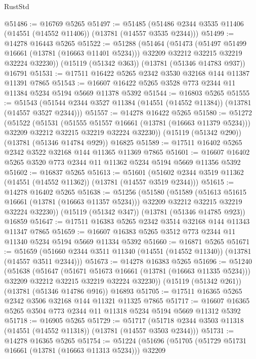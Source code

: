 \begin{lexlean}{RustStd}
\begin{coremodule}
@51486 := @16769 @5265
@51497 := @51485 (@51486 @2344 @3535 @11406 (@14551 (@14552 @11406)) (@13781 (@14557 @3535 @2344)))
@51499 := @14278 @16443 @5265
@51522 := @51288
    (@51464
      (@51473
        (@51497 @51499 @16661 (@13781 (@16663 @11401 @5234)))
        @32209
        @32212
        @32215
        @32219
        @32224
        @32230))
    (@15119 (@51342 @363))
    (@13781 (@51346 @14783 @937))
    @16791
@51531 := @17511 @16422 @5265 @2342 @3530 @32168 @144 @11387 @11391 @7865
@51543 := @16607 @16422 @5265 @3528 @773 @2344 @11 @11384 @5234 @5194 @5669 @11378 @5392
@51544 := @16803 @5265
@51555 := @51543 (@51544 @2344 @3527 @11384 (@14551 (@14552 @11384)) (@13781 (@14557 @3527 @2344)))
@51557 := @14278 @16422 @5265
@51580 := @51272
    (@51522
      (@51531
        (@51555 @51557 @16661 (@13781 (@16663 @11379 @5234)))
        @32209
        @32212
        @32215
        @32219
        @32224
        @32230))
    (@15119 (@51342 @290))
    (@13781 (@51346 @14784 @929))
    @16825
@51589 := @17511 @16402 @5265 @2342 @3522 @32168 @144 @11365 @11369 @7865
@51601 := @16607 @16402 @5265 @3520 @773 @2344 @11 @11362 @5234 @5194 @5669 @11356 @5392
@51602 := @16837 @5265
@51613 := @51601 (@51602 @2344 @3519 @11362 (@14551 (@14552 @11362)) (@13781 (@14557 @3519 @2344)))
@51615 := @14278 @16402 @5265
@51638 := @51256
    (@51580
      (@51589
        (@51613 @51615 @16661 (@13781 (@16663 @11357 @5234)))
        @32209
        @32212
        @32215
        @32219
        @32224
        @32230))
    (@15119 (@51342 @347))
    (@13781 (@51346 @14785 @923))
    @16859
@51647 := @17511 @16383 @5265 @2342 @3514 @32168 @144 @11343 @11347 @7865
@51659 := @16607 @16383 @5265 @3512 @773 @2344 @11 @11340 @5234 @5194 @5669 @11334 @5392
@51660 := @16871 @5265
@51671 := @51659 (@51660 @2344 @3511 @11340 (@14551 (@14552 @11340)) (@13781 (@14557 @3511 @2344)))
@51673 := @14278 @16383 @5265
@51696 := @51240
    (@51638
      (@51647
        (@51671 @51673 @16661 (@13781 (@16663 @11335 @5234)))
        @32209
        @32212
        @32215
        @32219
        @32224
        @32230))
    (@15119 (@51342 @261))
    (@13781 (@51346 @14786 @916))
    @16893
@51705 := @17511 @16365 @5265 @2342 @3506 @32168 @144 @11321 @11325 @7865
@51717 := @16607 @16365 @5265 @3504 @773 @2344 @11 @11318 @5234 @5194 @5669 @11312 @5392
@51718 := @16905 @5265
@51729 := @51717 (@51718 @2344 @3503 @11318 (@14551 (@14552 @11318)) (@13781 (@14557 @3503 @2344)))
@51731 := @14278 @16365 @5265
@51754 := @51224
    (@51696
      (@51705
        (@51729 @51731 @16661 (@13781 (@16663 @11313 @5234)))
        @32209

\end{coremodule}
\end{lexlean}
